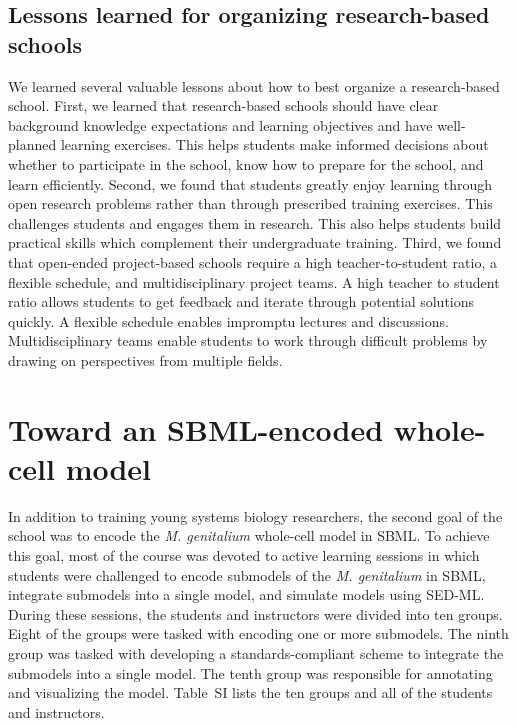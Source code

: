 \documentclass[journal,transmag]{IEEEtran}
\begin{document}
\subsection{Lessons learned for organizing research-based schools}
We learned several valuable lessons about how to best organize a research-based school. First, we learned that research-based schools should have clear background knowledge expectations and learning objectives and have well-planned learning exercises. This helps students make informed decisions about whether to participate in the school, know how to prepare for the school, and learn efficiently.
Second, we found that students greatly enjoy learning through open research problems rather than through prescribed training exercises. This challenges students and engages them in research. This also helps students build practical skills which complement their undergraduate training.
Third, we found that open-ended project-based schools require a high teacher-to-student ratio, a flexible schedule, and multidisciplinary project teams. A high teacher to student ratio allows students to get feedback and iterate through potential solutions quickly. A flexible schedule enables impromptu lectures and discussions. Multidisciplinary teams enable students to work through difficult problems by drawing on perspectives from multiple fields. 

\section{Toward an SBML-encoded whole-cell model}
In addition to training young systems biology researchers, the second goal of the school was to encode the \textit{M. genitalium} whole-cell model in SBML. To achieve this goal, most of the course was devoted to active learning sessions in which students were challenged to encode submodels of the \textit{M. genitalium} in SBML, integrate submodels into a single model, and simulate models using SED-ML. During these sessions, the students and instructors were divided into ten groups. Eight of the groups were tasked with encoding one or more submodels. The ninth group was tasked with developing a standards-compliant scheme to integrate the submodels into a single model. The tenth group was responsible for annotating and visualizing the model. Table~SI lists the ten groups and all of the students and instructors. 
\end{document}
